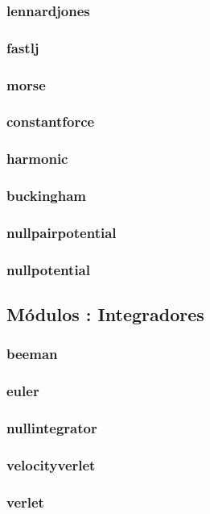 \documentclass[a4paper,10pt]{scrbook}
\begin{document}
\subsubsection{lennardjones}
\subsubsection{fastlj}
\subsubsection{morse}
\subsubsection{constantforce}
\subsubsection{harmonic}
\subsubsection{buckingham}
\subsubsection{nullpairpotential}
\subsubsection{nullpotential}

\subsection{M\'odulos : Integradores}
\subsubsection{beeman}
\subsubsection{euler}
\subsubsection{nullintegrator}
\subsubsection{velocityverlet}
\subsubsection{verlet}
\end{document}
